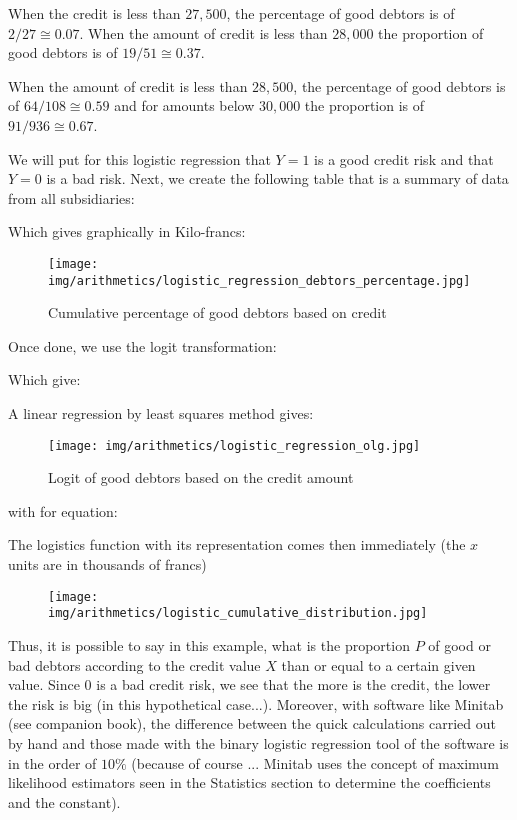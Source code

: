 	When the credit is less than $27,500$, the percentage of good debtors is of $2/27\cong 0.07$. When the amount of credit is less than $28,000$ the proportion of good debtors is of $19/51\cong 0.37$.
	
	When the amount of credit is less than $28,500$, the percentage of good debtors is of $64/108 \cong 0.59$ and for amounts below $30,000$ the proportion is of $91/936\cong 0.67$.
	
	We will put for this logistic regression that $Y=1$ is a good credit risk and that $Y=0$ is a bad risk. Next, we create the following table that is a summary of data from all subsidiaries:
	
	Which gives graphically in Kilo-francs:
	\begin{figure}[H]
		\centering
		\texttt{[image: img/arithmetics/logistic\_regression\_debtors\_percentage.jpg]}
		\caption{Cumulative percentage of good debtors based on credit}
	\end{figure}
	Once done, we use the logit transformation:
	
	Which give:
	
	A linear regression by least squares method gives:
	\begin{figure}[H]
		\centering
		\texttt{[image: img/arithmetics/logistic\_regression\_olg.jpg]}
		\caption{Logit of good debtors based on the credit amount}
	\end{figure}
	with for equation:
	
	The logistics function with its representation comes then immediately (the $x$ units are in thousands of francs)
	
	\begin{figure}[H]
		\centering
		\texttt{[image: img/arithmetics/logistic\_cumulative\_distribution.jpg]}
	\end{figure}
	Thus, it is possible to say in this example, what is the proportion $P$ of good or bad debtors according to the credit value $X$ than or equal to a certain given value. Since $0$ is a bad credit risk, we see that the more is the credit, the lower the risk is big (in this hypothetical case...). Moreover, with software like Minitab (see companion book), the difference between the quick calculations carried out by hand and those made with the binary logistic regression tool  of the software is in the order of $10\%$ (because of course ... Minitab uses the concept of maximum likelihood estimators seen in the Statistics section to determine the coefficients and the constant).
	
